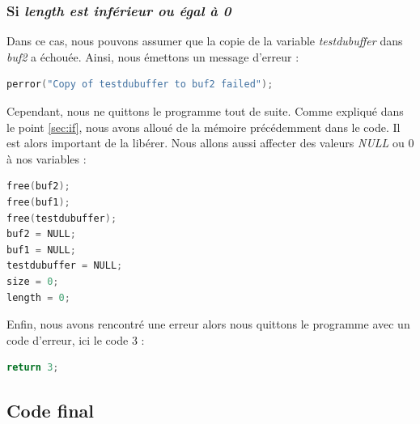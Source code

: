 \subsubsection{Si \textit{length est inférieur ou égal à 0}}

Dans ce cas, nous pouvons assumer que la copie de la variable \textit{testdubuffer} dans \textit{buf2} a échouée. Ainsi, nous émettons un message d'erreur :
\begin{lstlisting}[language=C]
perror("Copy of testdubuffer to buf2 failed");
\end{lstlisting}
Cependant, nous ne quittons le programme tout de suite. Comme expliqué dans le point \ref{sec:if}, nous avons alloué de la mémoire précédemment dans le code. Il est alors important de la libérer. Nous allons aussi affecter des valeurs \textit{NULL} ou $0$ à nos variables :
\begin{lstlisting}[language=C]
free(buf2);
free(buf1);
free(testdubuffer);
buf2 = NULL;
buf1 = NULL;
testdubuffer = NULL;
size = 0;
length = 0;
\end{lstlisting}
Enfin, nous avons rencontré une erreur alors nous quittons le programme avec un code d'erreur, ici le code 3 :
\begin{lstlisting}[language=C]
return 3;
\end{lstlisting}

\subsection{Code final}


